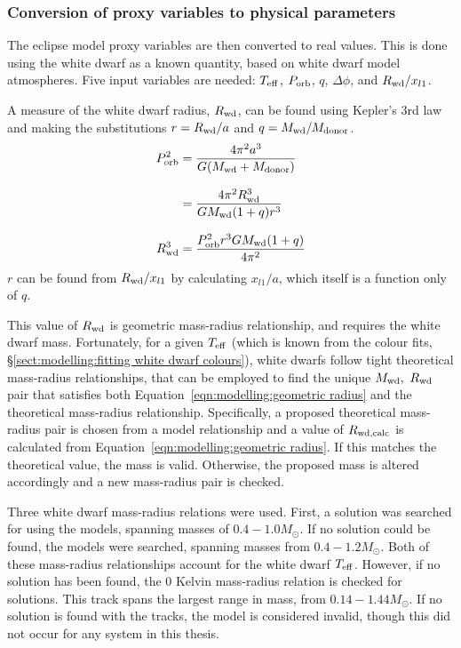 \subsubsection{Conversion of proxy variables to physical parameters}
\label{sect:modelling:conversion to physical parameters}
The eclipse model proxy variables are then converted to real values. This is done using the white dwarf as a known quantity, based on white dwarf model atmospheres. Five input variables are needed: $T_{\rm eff}$, $P_{\rm orb}$, $q$, $\Delta \phi$, and $R_{\rm wd} / x_{l1}$.


A measure of the white dwarf radius, $R_{\rm wd}$, can be found using Kepler's 3rd law and making the substitutions $r = R_{\rm wd} / a$ and $q = M_{\rm wd} / M_{\rm donor}$.
\begin{align}
    P_{\rm orb}^2 &= \frac{4 \pi^2 a^3}{G (M_{\rm wd} + M_{\rm donor})} \\[8pt]
    &= \frac{4 \pi^2 R_{\rm wd}^3}{G M_{\rm wd} (1 + q) r^3} \\[8pt]
    R_{\rm wd}^3 &= \frac{P_{\rm orb}^2 r^3 G M_{\rm wd} (1 + q) }{4 \pi^2}
    \label{eqn:modelling:geometric radius}
\end{align}
$r$ can be found from $R_{\rm wd} / x_{l1}$ by calculating $x_{l1} / a$, which itself is a function only of $q$.

This value of $R_{\rm wd}$ is geometric mass-radius relationship, and requires the white dwarf mass. Fortunately, for a given $T_{\rm eff}$ (which is known from the colour fits, \S\ref{sect:modelling:fitting white dwarf colours}), white dwarfs follow tight theoretical mass-radius relationships, that can be employed to find the unique $M_{\rm wd},\ R_{\rm wd}$ pair that satisfies both Equation~\ref{eqn:modelling:geometric radius} and the theoretical mass-radius relationship.
Specifically, a proposed theoretical mass-radius pair is chosen from a model relationship and a value of $R_{\rm wd, calc}$ is calculated from Equation~\ref{eqn:modelling:geometric radius}. If this matches the theoretical value, the mass is valid. Otherwise, the proposed mass is altered accordingly and a new mass-radius pair is checked.

Three white dwarf mass-radius relations were used. First, a solution was searched for using the \citet{wood1995} models, spanning masses of $0.4 - 1.0 M_\odot$.
If no solution could be found, the \citet{panei2000} models were searched, spanning masses from $0.4 - 1.2 M_\odot$.
Both of these mass-radius relationships account for the white dwarf $T_{\rm eff}$. However, if no solution has been found, the \citet{hamada1961} 0 Kelvin mass-radius relation is checked for solutions. This track spans the largest range in mass, from $0.14 - 1.44 M_\odot$. If no solution is found with the \citet{hamada1961} tracks, the model is considered invalid, though this did not occur for any system in this thesis.

